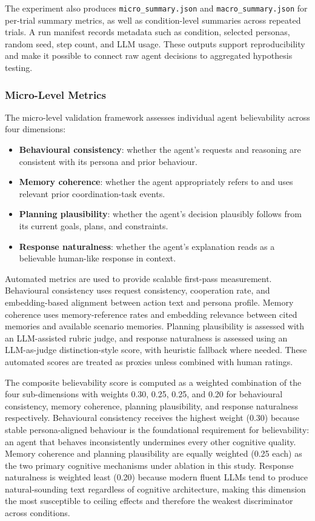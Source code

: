 \documentclass[11pt]{article}
\begin{document}
The experiment also produces \texttt{micro\_summary.json} and \texttt{macro\_summary.json} for per-trial summary metrics, as well as condition-level summaries across repeated trials. A run manifest records metadata such as condition, selected personas, random seed, step count, and LLM usage. These outputs support reproducibility and make it possible to connect raw agent decisions to aggregated hypothesis testing.

\subsubsection{Micro-Level Metrics}
The micro-level validation framework assesses individual agent believability across four dimensions:

\begin{itemize}
    \item \textbf{Behavioural consistency}: whether the agent's requests and reasoning are consistent with its persona and prior behaviour.
    \item \textbf{Memory coherence}: whether the agent appropriately refers to and uses relevant prior coordination-task events.
    \item \textbf{Planning plausibility}: whether the agent's decision plausibly follows from its current goals, plans, and constraints.
    \item \textbf{Response naturalness}: whether the agent's explanation reads as a believable human-like response in context.
\end{itemize}

Automated metrics are used to provide scalable first-pass measurement. Behavioural consistency uses request consistency, cooperation rate, and embedding-based alignment between action text and persona profile. Memory coherence uses memory-reference rates and embedding relevance between cited memories and available scenario memories. Planning plausibility is assessed with an LLM-assisted rubric judge, and response naturalness is assessed using an LLM-as-judge distinction-style score, with heuristic fallback where needed. These automated scores are treated as proxies unless combined with human ratings.

The composite believability score is computed as a weighted combination of the four sub-dimensions with weights 0.30, 0.25, 0.25, and 0.20 for behavioural consistency, memory coherence, planning plausibility, and response naturalness respectively. Behavioural consistency receives the highest weight (0.30) because stable persona-aligned behaviour is the foundational requirement for believability: an agent that behaves inconsistently undermines every other cognitive quality. Memory coherence and planning plausibility are equally weighted (0.25 each) as the two primary cognitive mechanisms under ablation in this study. Response naturalness is weighted least (0.20) because modern fluent LLMs tend to produce natural-sounding text regardless of cognitive architecture, making this dimension the most susceptible to ceiling effects and therefore the weakest discriminator across conditions.
\end{document}

